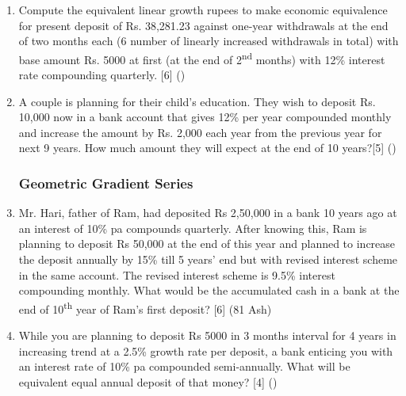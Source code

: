 \documentclass[12pt]{article}
\newcommand{\super}[1]{\textsuperscript{#1}}
\begin{document}
\begin{enumerate}[noitemsep, topsep=0pt]
			\item Compute the equivalent linear growth rupees to make economic equivalence for present deposit of Rs. 38,281.23 against one-year withdrawals at the end of two months each (6 number of linearly increased withdrawals in total) with base amount Rs. 5000 at first (at the end of 2\textsuperscript{nd} months) with 12\% interest rate compounding quarterly. \hfill[6] ()

			\item A couple is planning for their child's education. They wish to deposit Rs. 10,000 now in a bank account that gives 12\% per year compounded monthly and increase the amount by Rs. 2,000 each year from the previous year for next 9 years. How much amount they will expect at the end of 10 years?\hfill[5] ()
	
		\subsubsection{Geometric Gradient Series}
		
			\item Mr. Hari, father of Ram, had deposited Rs 2,50,000 in a bank 10 years ago at an interest of 10\% pa compounds quarterly. After knowing this, Ram is planning to deposit Rs 50,000 at the end of this year and planned to increase the deposit annually by 15\% till 5 years' end but with revised interest scheme in the same account. The revised interest scheme is 9.5\% interest compounding monthly. What would be the accumulated cash in a bank at the end of 10\super{th} year of Ram's first deposit? \hfill[6] (81 Ash)

			\item While you are planning to deposit Rs 5000 in 3 months interval for 4 years in increasing trend at a 2.5\% growth rate per deposit, a bank enticing you with an interest rate of 10\% pa compounded semi-annually. What will be equivalent equal annual deposit of that money? \hfill[4] ()
	\end{enumerate}

	\pagebreak
\end{document}
